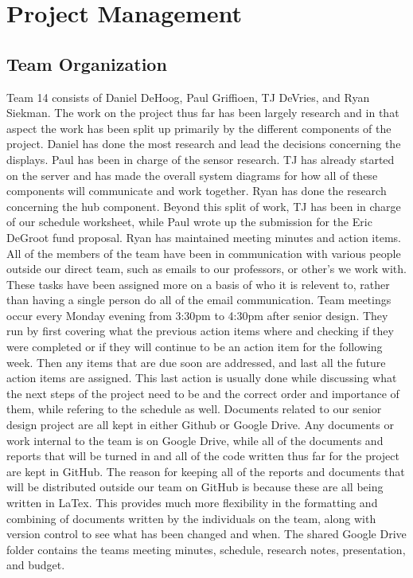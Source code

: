 \documentclass[ppfs.tex]{template/subfiles}
\begin{document}
\section{Project Management}
    \subsection{Team Organization}
	Team 14 consists of Daniel DeHoog, Paul Griffioen, TJ DeVries, and Ryan Siekman. The work on the project thus far has been largely research and in that aspect the work has been split up primarily by the different components of the project. Daniel has done the most research and lead the decisions concerning the displays. Paul has been in charge of the sensor research. TJ has already started on the server and has made the overall system diagrams for how all of these components will communicate and work together. Ryan has done the research concerning the hub component. Beyond this split of work, TJ has been in charge of our schedule worksheet, while Paul wrote up the submission for the Eric DeGroot fund proposal. Ryan has maintained meeting minutes and action items. All of the members of the team have been in communication with various people outside our direct team, such as emails to our professors, or other's we work with. These tasks have been assigned more on a basis of who it is relevent to, rather than having a single person do all of the email communication. 
	Team meetings occur every Monday evening from 3:30pm to 4:30pm after senior design. They run by first covering what the previous action items where and checking if they were completed or if they will continue to be an action item for the following week. Then any items that are due soon are addressed, and last all the future action items are assigned. This last action is usually done while discussing what the next steps of the project need to be and the correct order and importance of them, while refering to the schedule as well.
	Documents related to our senior design project are all kept in either Github or Google Drive. Any documents or work internal to the team is on Google Drive, while all of the documents and reports that will be turned in and all of the code written thus far for the project are kept in GitHub. The reason for keeping all of the reports and documents that will be distributed outside our team on GitHub is because these are all being written in LaTex. This provides much more flexibility in the formatting and combining of documents written by the individuals on the team, along with version control to see what has been changed and when. The shared Google Drive folder contains the teams meeting minutes, schedule, research notes, presentation, and budget.
	
\end{document}
